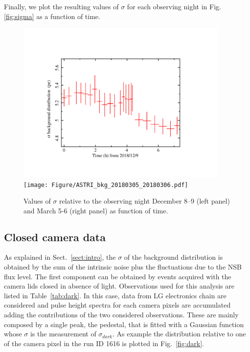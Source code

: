 Finally, we plot the resulting values of $\sigma$ for each observing night in Fig.\ref{fig:sigma}  as a function of time. 

\begin{figure}[ht!!]
\includegraphics[angle=0, width=10.5cm]{Figure/ASTRI_bkg_20181208_20181209.pdf}
\texttt{[image: Figure/ASTRI\_bkg\_20180305\_20180306.pdf]}
\vspace{0.5cm}
\caption{Values of $\sigma$ relative to the observing night December 8--9 (left panel) and March 5-6 (right panel) as function of time. }
\label{fig:FOC}
\end{figure}

\subsection{Closed camera data} 

As explained in Sect.~\ref{sect:intro}, the $\sigma$ of the background distribution is obtained by the sum of the intrinsic noise plus the fluctuations due to the NSB flux level. The first component can be obtained by events acquired with the camera lids closed in absence of light.
Observations used for this analysis are listed in Table~\ref{tab:dark}. In this case, data from LG electronics chain are considered and pulse height spectra for each camera pixels are accumulated adding the contributions of the two considered observations. These are mainly composed by a single peak, the pedestal, that is fitted with a Gaussian function whose $\sigma$ is the measurement of $\sigma_{dark}$. As example the distribution relative to one of the camera pixel in the run ID 1616 is plotted in Fig.~\ref{fig:dark}.


